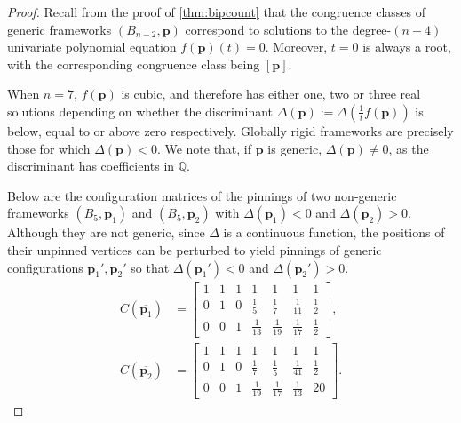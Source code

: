 \documentclass[11pt]{amsart}
\theoremstyle{definition}
\theoremstyle{remark}
\begin{document}
\begin{proof}
    Recall from the proof of \cref{thm:bipcount} that the congruence classes of generic frameworks $(B_{n-2},\mathbf{p})$ correspond to solutions to the degree-$(n-4)$ univariate polynomial equation $f(\mathbf{p})(t)=0$.
    Moreover, $t=0$ is always a root, with the corresponding congruence class being $[\mathbf{p}]$.
    
    When $n=7$, $f(\mathbf{p})$ is cubic, and therefore has either one, two or three real solutions depending on whether the discriminant $\Delta(\mathbf{p}):=\Delta\left(\frac{1}{t}f(\mathbf{p})\right)$ is below, equal to or above zero respectively.
    Globally rigid frameworks are precisely those for which $\Delta(\mathbf{p})<0$.
    We note that, if $\mathbf{p}$ is generic, $\Delta(\mathbf{p})\neq0$, as the discriminant has coefficients in $\mathbb{Q}$.

    Below are the configuration matrices of the pinnings of two non-generic frameworks $(B_5,\mathbf{p}_1)$ and $(B_5,\mathbf{p}_2)$ with $\Delta(\mathbf{p}_1)<0$ and $\Delta(\mathbf{p}_2)>0$.
    Although they are not generic, since $\Delta$ is a continuous function, the positions of their unpinned vertices can be perturbed to yield pinnings of generic configurations $\mathbf{p}_1',\mathbf{p}_2'$ so that $\Delta(\mathbf{p}_1')<0$ and $\Delta(\mathbf{p}_2')>0$.
    \begin{equation*}
    \begin{split}
        C(\overline{\mathbf{p}_1}) &= \begin{bmatrix}
            1 & 1 & 1 & 1 & 1 & 1 & 1 \\
            0 & 1 & 0 & \frac{1}{5} & \frac{1}{7} & \frac{1}{11} & \frac{1}{2} \\
            0 & 0 & 1 & \frac{1}{13} & \frac{1}{19} & \frac{1}{17} & \frac{1}{2}
        \end{bmatrix}, \\
        C(\overline{\mathbf{p}_2}) &= \begin{bmatrix}
            1 & 1 & 1 & 1 & 1 & 1 & 1 \\
            0 & 1 & 0 & \frac{1}{7} & \frac{1}{5} & \frac{1}{41} & \frac{1}{2} \\
            0 & 0 & 1 & \frac{1}{19} & \frac{1}{17} & \frac{1}{13} & 20
        \end{bmatrix}.
    \end{split}
    \end{equation*}
\end{proof}



\end{document}
